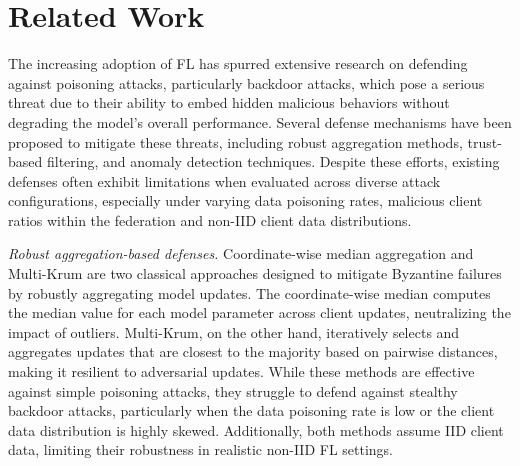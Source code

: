 \section{Related Work}
\label{sec:related_work}



The increasing adoption of FL has spurred extensive research on defending against poisoning attacks, particularly backdoor attacks, which pose a serious threat due to their ability to embed hidden malicious behaviors without degrading the model’s overall performance. Several defense mechanisms have been proposed to mitigate these threats, including robust aggregation methods, trust-based filtering, and anomaly detection techniques. Despite these efforts, existing defenses often exhibit limitations when evaluated across diverse attack configurations, especially under varying data poisoning rates, malicious client ratios within the federation and non-IID client data distributions.

\textit{Robust aggregation-based defenses.} Coordinate-wise median aggregation \citep{yin2018byzantine} and Multi-Krum \citep{blanchard2017machine} are two classical approaches designed to mitigate Byzantine failures by robustly aggregating model updates. The coordinate-wise median computes the median value for each model parameter across client updates, neutralizing the impact of outliers. Multi-Krum, on the other hand, iteratively selects and aggregates updates that are closest to the majority based on pairwise distances, making it resilient to adversarial updates. While these methods are effective against simple poisoning attacks, they struggle to defend against stealthy backdoor attacks, particularly when the data poisoning rate is low or the client data distribution is highly skewed. Additionally, both methods assume IID client data, limiting their robustness in realistic non-IID FL settings.

